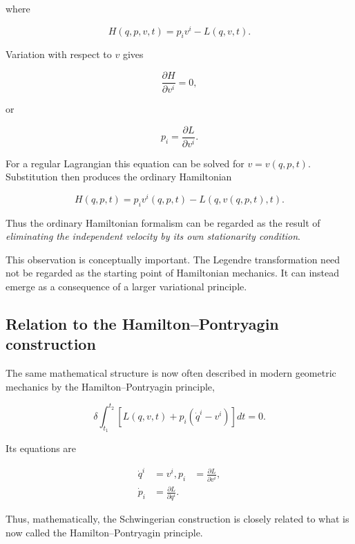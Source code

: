 where

\begin{equation}
H(q,p,v,t)=p_iv^i-L(q,v,t).
\end{equation}

Variation with respect to \(v\) gives

\begin{equation}
\frac{\partial H}{\partial v^i}=0,
\end{equation}

or

\begin{equation}
p_i=
\frac{\partial L}{\partial v^i}.
\end{equation}

For a regular Lagrangian this equation can be solved for \(v=v(q,p,t)\). Substitution then produces the ordinary Hamiltonian

\begin{equation}
H(q,p,t)=p_i v^i(q,p,t)-L(q,v(q,p,t),t).
\end{equation}

Thus the ordinary Hamiltonian formalism can be regarded as the result of \emph{eliminating the independent velocity by its own stationarity condition}.

This observation is conceptually important. The Legendre transformation need not be regarded as the starting point of Hamiltonian mechanics. It can instead emerge as a consequence of a larger variational principle.

\subsection{Relation to the Hamilton--Pontryagin construction}

The same mathematical structure is now often described in modern geometric mechanics by the Hamilton--Pontryagin principle,

\begin{equation}
\delta
\int_{t_1}^{t_2}
\left[
L(q,v,t)
+
p_i(\dot q^i-v^i)
\right]dt
=0.
\label{eq:HP}
\end{equation}

Its equations are

\begin{align}
\dot q^i &=v^i,p_i&=\frac{\partial L}{\partial v^i},\\
\dot p_i&=\frac{\partial L}{\partial q^i}.
\end{align}

Thus, mathematically, the Schwingerian construction is closely related to what is now called the Hamilton--Pontryagin principle.

